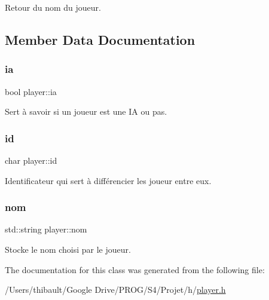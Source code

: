 Retour du nom du joueur. 



\subsection{Member Data Documentation}
\mbox{\label{classplayer_ab5c7590da844e3e2128868820ab9ec45}} 
\subsubsection{\texorpdfstring{ia}{ia}}
{\footnotesize\ttfamily bool player\+::ia\hspace{0.3cm}{\ttfamily [private]}}



Sert à savoir si un joueur est une IA ou pas. 

\mbox{\label{classplayer_a5862f005a5367e1b0dc19bdf2846fd34}} 
\subsubsection{\texorpdfstring{id}{id}}
{\footnotesize\ttfamily char player\+::id\hspace{0.3cm}{\ttfamily [private]}}



Identificateur qui sert à différencier les joueur entre eux. 

\mbox{\label{classplayer_ae6c0f854d63dc4b938b52f10b4334dbc}} 
\subsubsection{\texorpdfstring{nom}{nom}}
{\footnotesize\ttfamily std\+::string player\+::nom\hspace{0.3cm}{\ttfamily [private]}}



Stocke le nom choisi par le joueur. 



The documentation for this class was generated from the following file\+:\begin{DoxyCompactItemize}
\item 
/\+Users/thibault/\+Google Drive/\+P\+R\+O\+G/\+S4/\+Projet/h/\hyperlink{player_8h}{player.\+h}\end{DoxyCompactItemize}
